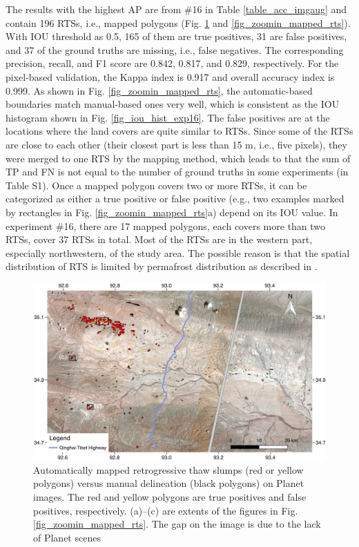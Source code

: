 \documentclass[preprint,12pt,authoryear]{elsarticle}
\begin{document}
The results with the highest AP are from \#16 in Table \ref{table_acc_imgaug} and contain 196 RTSs, i.e., mapped polygons (Fig. \ref{fig_mapped_rts} and \ref{fig_zoomin_mapped_rts}). With IOU threshold as 0.5, 165 of them are true positives, 31 are false positives, and 37 of the ground truths are missing, i.e., false negatives. The corresponding precision, recall, and F1 score are 0.842, 0.817, and 0.829, respectively. For the pixel-based validation, the Kappa index is 0.917 and overall accuracy index is 0.999. As shown in Fig. \ref{fig_zoomin_mapped_rts}, the automatic-based boundaries match manual-based ones very well, which is consistent as the IOU histogram shown in Fig. \ref{fig_iou_hist_exp16}. The false positives are at the locations where the land covers are quite similar to RTSs. Since some of the RTSs are close to each other (their closest part is less than 15 m, i.e., five pixels), they were merged to one RTS by the mapping method, which leads to that the sum of TP and FN is not equal to the number of ground truths in some experiments (in Table S1). Once a mapped polygon covers two or more RTSs, it can be categorized as either a true positive or false positive (e.g., two examples marked by rectangles in Fig. \ref{fig_zoomin_mapped_rts}a) depend on its IOU value. In experiment \#16, there are 17 mapped polygons, each covers more than two RTSs, cover 37 RTSs in total. Most of the RTSs are in the western part, especially northwestern, of the study area. The possible reason is that the spatial distribution of RTS is limited by permafrost distribution as described in \citealp{yin2017effects}. %

\begin{figure}
	\centering
	\includegraphics[width=14cm]{figures/whole_area_mapped_trim.jpg}
	\caption{Automatically mapped retrogressive thaw slumps (red or yellow polygons) versus manual delineation (black polygons) on Planet images. The red and yellow polygons are true positives and false positives, respectively.  (a)--(c) are extents of the figures in Fig. \ref{fig_zoomin_mapped_rts}. The gap on the image is due to the lack of Planet scenes}
	\label{fig_mapped_rts}
\end{figure}
\end{document}
